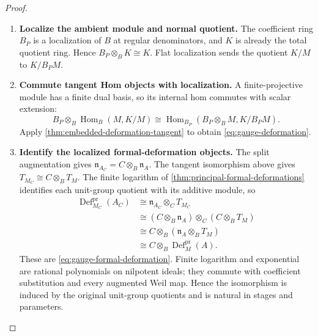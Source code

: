 \documentclass[11pt,a4paper]{article}
\numberwithin{algorithm}{section}
\numberwithin{equation}{section}
\theoremstyle{definition}
\theoremstyle{remark}
\theoremstyle{plain}
\newcommand{\Hom}{\operatorname{Hom}}
\theoremstyle{definition}
\theoremstyle{plain}
\begin{document}
\begin{proof}\leavevmode
\begin{enumerate}[leftmargin=*,align=left]
\item \textbf{Localize the ambient module and normal quotient.}
The coefficient ring $B_P$ is a localization of $B$ at
regular denominators, and $K$ is already the total
quotient ring.  Hence $B_P\otimes_BK\cong K$.
Flat localization sends the quotient $K/M$ to
$K/B_PM$.

\item \textbf{Commute tangent Hom objects with localization.}
A finite-projective module has a finite dual
basis, so its internal hom commutes with scalar extension:
\[
 B_P\otimes_B\Hom_B(M,K/M)
 \cong\Hom_{B_P}(B_P\otimes_BM,K/B_PM).
\]
Apply \cref{thm:embedded-deformation-tangent} to obtain
\eqref{eq:gauge-deformation}.

\item \textbf{Identify the localized formal-deformation objects.}
The split augmentation gives
$\mathfrak n_{A_C}=C\otimes_B\mathfrak n_A$.
The tangent isomorphism above gives $T_{M_C}\cong C\otimes_BT_M$.
The finite logarithm of \cref{thm:principal-formal-deformations}
identifies each unit-group quotient with its additive module, so
\[
\begin{aligned}
 \operatorname{Def}^{\mathrm{pr}}_{M_C}(A_C)
 &\cong\mathfrak n_{A_C}\otimes_C T_{M_C}\\
 &\cong(C\otimes_B\mathfrak n_A)\otimes_C(C\otimes_BT_M)\\
 &\cong C\otimes_B(\mathfrak n_A\otimes_BT_M)\\
 &\cong C\otimes_B\operatorname{Def}^{\mathrm{pr}}_M(A).
\end{aligned}
\]
These are \eqref{eq:gauge-formal-deformation}. Finite logarithm
and exponential are rational polynomials on nilpotent ideals;
they commute with coefficient substitution and every augmented
Weil map. Hence the isomorphism is induced by the original
unit-group quotients and is natural in stages and parameters.
\end{enumerate}
\end{proof}
\end{document}
